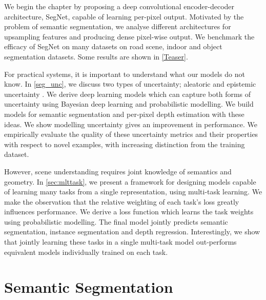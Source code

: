 We begin the chapter by proposing a deep convolutional encoder-decoder architecture, SegNet, capable of learning per-pixel output. Motivated by the problem of semantic segmentation, we analyse different architectures for upsampling features and producing dense pixel-wise output. We benchmark the efficacy of SegNet on many datasets on road scene, indoor and object segmentation datasets. Some results are shown in \cref{Teaser}.

For practical systems, it is important to understand what our models do not know. In \cref{seg_unc}, we discuss two types of uncertainty; aleatoric and epistemic uncertainty \citep{der2009aleatory}. We derive deep learning models which can capture both forms of uncertainty using Bayesian deep learning \citep{mackay1992practical} and probabilistic modelling. We build models for semantic segmentation and per-pixel depth estimation with these ideas. We show modelling uncertainty gives an improvement in performance. We empirically evaluate the quality of these uncertainty metrics and their properties with respect to novel examples, with increasing distinction from the training dataset.

However, scene understanding requires joint knowledge of semantics and geometry. In \cref{sec:mlttask}, we present a framework for designing models capable of learning many tasks from a single representation, using multi-task learning. We make the observation that the relative weighting of each task's loss greatly influences performance. We derive a loss function which learns the task weights using probabilistic modelling. The final model jointly predicts semantic segmentation, instance segmentation and depth regression. Interestingly, we show that jointly learning these tasks in a single multi-task model out-performs equivalent models individually trained on each task.

\section{Semantic Segmentation}
\label{segmentation}

